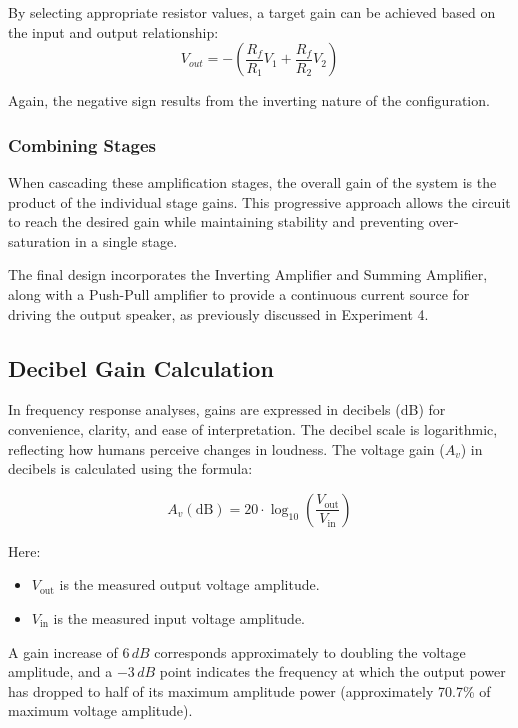 \documentclass[12pt]{article}
\begin{document}
By selecting appropriate resistor values, a target gain can be achieved based on
the input and output relationship: \begin{equation} V_{out} = -\left(
	\frac{R_f}{R_1}V_1 + \frac{R_f}{R_2}V_2 \right) \end{equation}

Again, the negative sign results from the inverting nature of the configuration.

\subsubsection{Combining Stages}

When cascading these amplification stages, the overall gain of the system is the
product of the individual stage gains. This progressive approach allows the
circuit to reach the desired gain while maintaining stability and preventing
over-saturation in a single stage.

The final design incorporates the Inverting Amplifier and Summing Amplifier,
along with a Push-Pull amplifier to provide a continuous current source for
driving the output speaker, as previously discussed in Experiment 4.

\subsection{Decibel Gain Calculation}

In frequency response analyses, gains are expressed in decibels (dB) for convenience, clarity, and ease of interpretation. The decibel scale is logarithmic, reflecting how humans perceive changes in loudness. The voltage gain ($A_v$) in decibels is calculated using the formula:

\begin{equation}
	A_v(\text{dB}) = 20 \cdot \log_{10}\left(\frac{V_{\text{out}}}{V_{\text{in}}}\right)
\end{equation}

Here:
\begin{itemize}
	\item $V_{\text{out}}$ is the measured output voltage amplitude.
	\item $V_{\text{in}}$ is the measured input voltage amplitude.
\end{itemize}

A gain increase of $6\,dB$ corresponds approximately to doubling the voltage amplitude, and a $-3\,dB$ point indicates the frequency at which the output power has dropped to half of its maximum amplitude power (approximately 70.7\% of maximum voltage amplitude).
\end{document}
